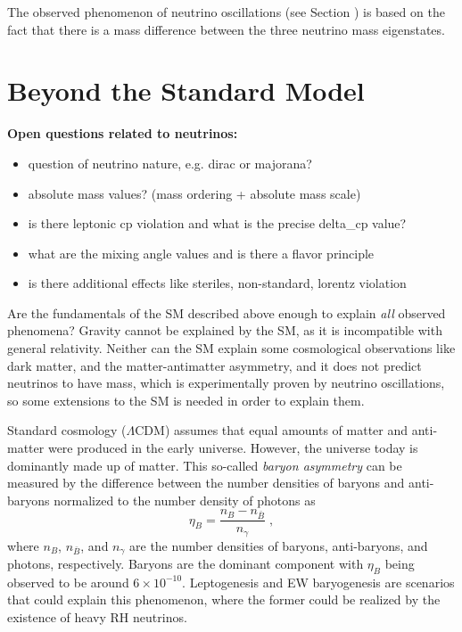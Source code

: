 The observed phenomenon of neutrino oscillations (see Section ) is based on the fact that there is a mass difference between the three neutrino mass eigenstates.


\section{Beyond the Standard Model}

\textbf{Open questions related to neutrinos:}
\begin{itemize}
    \item question of neutrino nature, e.g. dirac or majorana?
    \item absolute mass values? (mass ordering + absolute mass scale)
    \item is there leptonic cp violation and what is the precise delta\_cp value?
    \item what are the mixing angle values and is there a flavor principle
    \item is there additional effects like steriles, non-standard, lorentz violation
\end{itemize}


Are the fundamentals of the SM described above enough to explain \textit{all} observed phenomena? Gravity cannot be explained by the SM, as it is incompatible with general relativity. Neither can the SM explain some cosmological observations like dark matter, and the matter-antimatter asymmetry, and it does not predict neutrinos to have mass, which is experimentally proven by neutrino oscillations, so some extensions to the SM is needed in order to explain them.

Standard cosmology ($\Lambda$CDM) assumes that equal amounts of matter and anti-matter were produced in the early universe. However, the universe today is dominantly made up of matter. This so-called \textit{baryon asymmetry} can be measured by the difference between the number densities of baryons and anti-baryons normalized to the number density of photons as
\begin{equation}
    \eta_B = \frac{n_B - n_{\bar{B}}}{n_\gamma}
    \;,
\end{equation}
where $n_B$, $n_{\bar{B}}$, and $n_\gamma$ are the number densities of baryons, anti-baryons, and photons, respectively. Baryons are the dominant component with  $\eta_B$ being observed to be around $6 \times 10^{-10}$. Leptogenesis and EW baryogenesis are scenarios that could explain this phenomenon, where the former could be realized by the existence of heavy RH neutrinos.

